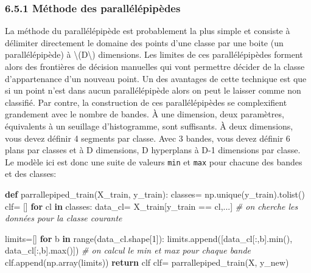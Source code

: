 \documentclass[
]{article}
\newenvironment{Shaded}{}{}
\newcommand{\BuiltInTok}[1]{\textcolor[rgb]{0.00,0.50,0.00}{#1}}
\newcommand{\CommentTok}[1]{\textcolor[rgb]{0.38,0.63,0.69}{\textit{#1}}}
\newcommand{\ControlFlowTok}[1]{\textcolor[rgb]{0.00,0.44,0.13}{\textbf{#1}}}
\newcommand{\DecValTok}[1]{\textcolor[rgb]{0.25,0.63,0.44}{#1}}
\newcommand{\KeywordTok}[1]{\textcolor[rgb]{0.00,0.44,0.13}{\textbf{#1}}}
\newcommand{\NormalTok}[1]{#1}
\newcommand{\OperatorTok}[1]{\textcolor[rgb]{0.40,0.40,0.40}{#1}}
\begin{document}
\subsubsection{\texorpdfstring{{6.5.1} Méthode des
parallélépipèdes}{6.5.1 Méthode des parallélépipèdes}}\label{muxe9thode-des-paralluxe9luxe9pipuxe8des}

La méthode du parallélépipède est probablement la plus simple et
consiste à délimiter directement le domaine des points d'une classe par
une boite (un parallélépipède) à {\textbackslash(D\textbackslash)}
dimensions. Les limites de ces parallélépipèdes forment alors des
frontières de décision manuelles qui vont permettre décider de la classe
d'appartenance d'un nouveau point. Un des avantages de cette technique
est que si un point n'est dans aucun parallélépipède alors on peut le
laisser comme non classifié. Par contre, la construction de ces
parallélépipèdes se complexifient grandement avec le nombre de bandes. À
une dimension, deux paramètres, équivalents à un seuillage
d'histogramme, sont suffisants. À deux dimensions, vous devez définir 4
segments par classe. Avec 3 bandes, vous devez définir 6 plans par
classes et à D dimensions, D hyperplans à D-1 dimensions par classe. Le
modèle ici est donc une suite de valeurs \texttt{min} et \texttt{max}
pour chacune des bandes et des classes:

\label{80045a3b}
\label{cb20}
\begin{Shaded}
\begin{Highlighting}[]
\KeywordTok{def}\NormalTok{ parrallepiped\_train(X\_train, y\_train):}
\NormalTok{  classes}\OperatorTok{=}\NormalTok{ np.unique(y\_train).tolist()}
\NormalTok{  clf}\OperatorTok{=}\NormalTok{ []}
  \ControlFlowTok{for}\NormalTok{ cl }\KeywordTok{in}\NormalTok{ classes:}
\NormalTok{      data\_cl}\OperatorTok{=}\NormalTok{ X\_train[y\_train }\OperatorTok{==}\NormalTok{ cl,...] }\CommentTok{\# on cherche les données pour la classe courante}
      
\NormalTok{      limits}\OperatorTok{=}\NormalTok{[]}
      \ControlFlowTok{for}\NormalTok{ b }\KeywordTok{in} \BuiltInTok{range}\NormalTok{(data\_cl.shape[}\DecValTok{1}\NormalTok{]):}
\NormalTok{        limits.append([data\_cl[:,b].}\BuiltInTok{min}\NormalTok{(), data\_cl[:,b].}\BuiltInTok{max}\NormalTok{()]) }\CommentTok{\# on calcul le min et max pour chaque bande}
\NormalTok{      clf.append(np.array(limits))}
  \ControlFlowTok{return}\NormalTok{ clf}
\NormalTok{clf}\OperatorTok{=}\NormalTok{ parrallepiped\_train(X, y\_new)}
\end{Highlighting}
\end{Shaded}
\end{document}
